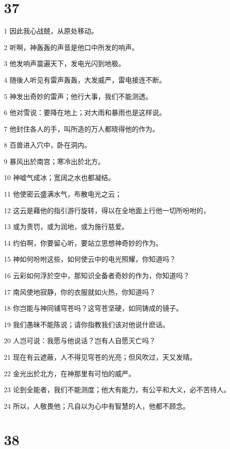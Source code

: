 \chapter{37}

\par 1 因此我心战兢，从原处移动。
\par 2 听啊，神轰轰的声音是他口中所发的响声。
\par 3 他发响声震遍天下，发电光闪到地极。
\par 4 随後人听见有雷声轰轰，大发威严，雷电接连不断。
\par 5 神发出奇妙的雷声；他行大事，我们不能测透。
\par 6 他对雪说：要降在地上；对大雨和暴雨也是这样说。
\par 7 他封住各人的手，叫所造的万人都晓得他的作为。
\par 8 百兽进入穴中，卧在洞内。
\par 9 暴风出於南宫；寒冷出於北方。
\par 10 神嘘气成冰；宽阔之水也都凝结。
\par 11 他使密云盛满水气，布散电光之云；
\par 12 这云是藉他的指引游行旋转，得以在全地面上行他一切所吩咐的，
\par 13 或为责罚，或为润地，或为施行慈爱。
\par 14 约伯啊，你要留心听，要站立思想神奇妙的作为。
\par 15 神如何吩咐这些，如何使云中的电光照耀，你知道吗？
\par 16 云彩如何浮於空中，那知识全备者奇妙的作为，你知道吗？
\par 17 南风使地寂静，你的衣服就如火热，你知道吗？
\par 18 你岂能与神同铺穹苍吗？这穹苍坚硬，如同铸成的镜子。
\par 19 我们愚昧不能陈说；请你指教我们该对他说什麽话。
\par 20 人岂可说：我愿与他说话？岂有人自愿灭亡吗？
\par 21 现在有云遮蔽，人不得见穹苍的光亮；但风吹过，天又发晴。
\par 22 金光出於北方，在神那里有可怕的威严。
\par 23 论到全能者，我们不能测度；他大有能力，有公平和大义，必不苦待人。
\par 24 所以，人敬畏他；凡自以为心中有智慧的人，他都不顾念。

\chapter{38}

